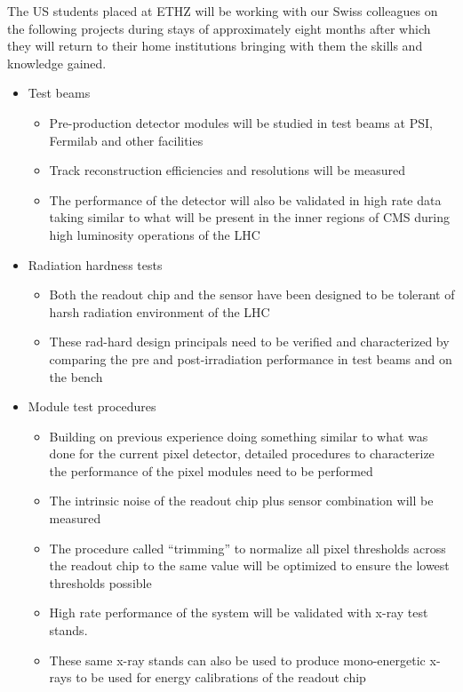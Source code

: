 The US students placed at ETHZ will be working with our Swiss
colleagues on the following projects during stays of approximately
eight months after which they will return to their home institutions
bringing with them the skills and knowledge gained.
\begin{itemize}
\item Test beams
  \begin{itemize}
  \item Pre-production detector modules will be studied in test beams
    at PSI, Fermilab and other facilities
  \item Track reconstruction efficiencies and resolutions will be
    measured
  \item The performance of the detector will also be validated in high
    rate data taking similar to what will be present in the inner
    regions of CMS during high luminosity operations of the LHC
  \end{itemize}
\item Radiation hardness tests
  \begin{itemize}
  \item Both the readout chip and the sensor have been designed to be
    tolerant of harsh radiation environment of the LHC
  \item These rad-hard design principals need to be verified and
    characterized by comparing the pre and post-irradiation
    performance in test beams and on the bench
  \end{itemize}
\item Module test procedures
  \begin{itemize}
  \item Building on previous experience doing something similar to
    what was done for the current pixel detector, detailed procedures
    to characterize the performance of the pixel modules need to be performed
  \item The intrinsic noise of the readout chip plus sensor
    combination will be measured
  \item The procedure called ``trimming'' to normalize all pixel
    thresholds across the readout chip to the same value will be
    optimized to ensure the lowest thresholds possible
  \item High rate performance of the system will be validated with
    x-ray test stands.
  \item These same x-ray stands can also be used to produce
    mono-energetic x-rays to be used for energy calibrations of the
    readout chip
  \end{itemize}
\end{itemize}

